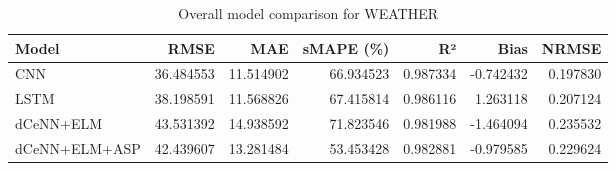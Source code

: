 \begin{table}
\caption{Overall model comparison for WEATHER}
\begin{tabular}{lrrrrrr}
\toprule
Model & RMSE & MAE & sMAPE (\%) & R² & Bias & NRMSE \\
\midrule
CNN & 36.484553 & 11.514902 & 66.934523 & 0.987334 & -0.742432 & 0.197830 \\
LSTM & 38.198591 & 11.568826 & 67.415814 & 0.986116 & 1.263118 & 0.207124 \\
dCeNN+ELM & 43.531392 & 14.938592 & 71.823546 & 0.981988 & -1.464094 & 0.235532 \\
dCeNN+ELM+ASP & 42.439607 & 13.281484 & 53.453428 & 0.982881 & -0.979585 & 0.229624 \\
\bottomrule
\end{tabular}
\end{table}
